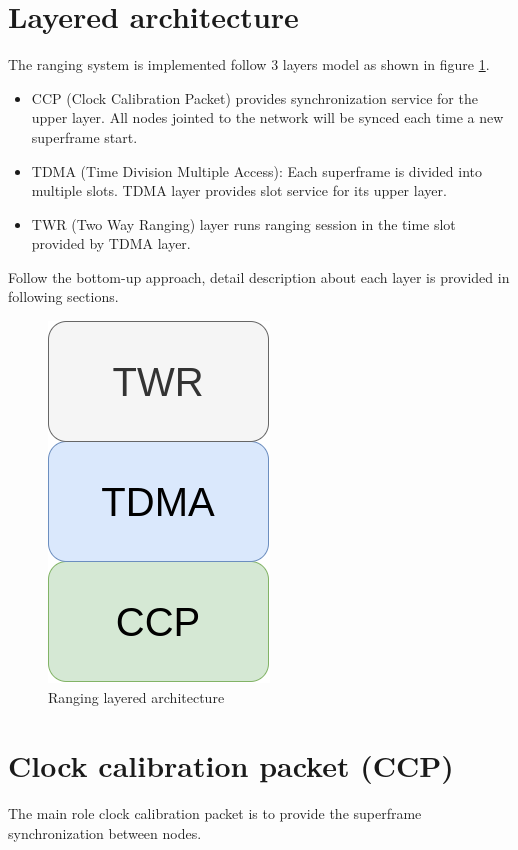 \documentclass[\main/main.tex]{subfiles}
\begin{document}
\section{Layered architecture}
The ranging system is implemented follow 3 layers model as shown in figure \ref{fig:ranging_layered_architecture}. 
\begin{itemize}
    \item CCP (Clock Calibration Packet) provides synchronization service for the upper layer. All nodes jointed to the network will be synced each time a new superframe start.
    \item TDMA (Time Division Multiple Access): Each superframe is divided into multiple slots. TDMA layer provides slot service for its upper layer. 
    \item TWR (Two Way Ranging) layer runs ranging session in the time slot provided by TDMA layer.
\end{itemize}

Follow the bottom-up approach, detail description about each layer is provided in following sections.
\begin{figure}[H]
    \begin{center}
        \includegraphics[scale=0.3]{ranging_layered_architecture}
    \end{center}
    \caption{Ranging layered architecture}
    \label{fig:ranging_layered_architecture}
\end{figure}

\section{Clock calibration packet (CCP)}
The main role clock calibration packet is to provide the superframe synchronization between nodes. 
\end{document}
